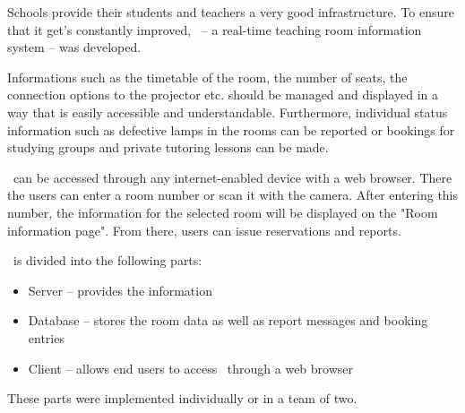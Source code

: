     Schools provide their students and teachers a very good infrastructure. 
    To ensure that it get's constantly improved, \ZELIA\ -- a real-time teaching room information system -- was developed.
    
    Informations such as the timetable of the room, the number of seats, the con\-nec\-tion options to the projector etc. should be managed and displayed in a way that is easily accessible and understandable.
    Furthermore, individual status information such as defective lamps in the rooms can be reported or bookings for studying groups and private tutoring lessons can be made.
    
    \ZELIA\ can be accessed through any internet-enabled device with a web browser. 
    There the users can enter a room number or scan it with the camera. 
    After entering this number, the information for the selected room will be displayed on the "Room information page". 
    From there, users can issue reservations and reports.
    
    \ZELIA\ is divided into the following parts:
    \begin{itemize}
        \item Server -- provides the information
        \item Database -- stores the room data as well as report messages and booking entries
        \item Client -- allows end users to access \ZELIA\ through a web browser
    \end{itemize}
    
    These parts were implemented individually or in a team of two.
